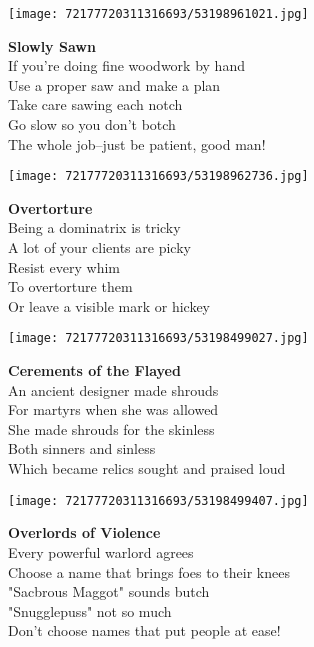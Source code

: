 \documentclass[10pt,letterpaper]{article}
\begin{document}
\begin{center}\texttt{[image: 72177720311316693/53198961021.jpg]}
\end{center}
\begin{center}
\textbf{Slowly Sawn}\\
\vskip 0.2in
If you're doing fine woodwork by hand\\
Use a proper saw and make a plan\\
Take care sawing each notch\\
Go slow so you don't botch\\
The whole job--just be patient, good man!\\
\end{center}
\pagebreak

\begin{center}
\texttt{[image: 72177720311316693/53198962736.jpg]}
\end{center}

\begin{center}
\textbf{Overtorture}\\
\vskip 0.2in
Being a dominatrix is tricky\\
A lot of your clients are picky\\
Resist every whim\\
To overtorture them\\
Or leave a visible mark or hickey\\
\end{center}
\pagebreak

\begin{center}\texttt{[image: 72177720311316693/53198499027.jpg]}
\end{center}
\begin{center}
\textbf{Cerements of the Flayed}\\
\vskip 0.2in
An ancient designer made shrouds\\
For martyrs when she was allowed\\
She made shrouds for the skinless\\
Both sinners and sinless\\
Which became relics sought and praised loud\\
\end{center}
\pagebreak

\begin{center}\texttt{[image: 72177720311316693/53198499407.jpg]}
\end{center}
\begin{center}
\textbf{Overlords of Violence}\\
\vskip 0.2in
Every powerful warlord agrees\\
Choose a name that brings foes to their knees\\
"Sacbrous Maggot" sounds butch\\
"Snugglepuss" not so much\\
Don't choose names that put people at ease!\\
\end{center}
\pagebreak
\end{document}
